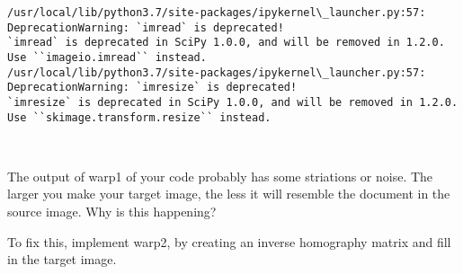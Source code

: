 \documentclass[11pt]{article}
\begin{document}
    \begin{Verbatim}[commandchars=\\\{\}]
/usr/local/lib/python3.7/site-packages/ipykernel\_launcher.py:57: DeprecationWarning: `imread` is deprecated!
`imread` is deprecated in SciPy 1.0.0, and will be removed in 1.2.0.
Use ``imageio.imread`` instead.
/usr/local/lib/python3.7/site-packages/ipykernel\_launcher.py:57: DeprecationWarning: `imresize` is deprecated!
`imresize` is deprecated in SciPy 1.0.0, and will be removed in 1.2.0.
Use ``skimage.transform.resize`` instead.

    \end{Verbatim}

    \begin{center}
    \end{center}
    { \hspace*{\fill} \\}
    
    The output of warp1 of your code probably has some striations or noise.
The larger you make your target image, the less it will resemble the
document in the source image. Why is this happening?

To fix this, implement warp2, by creating an inverse homography matrix
and fill in the target image.
\end{document}
